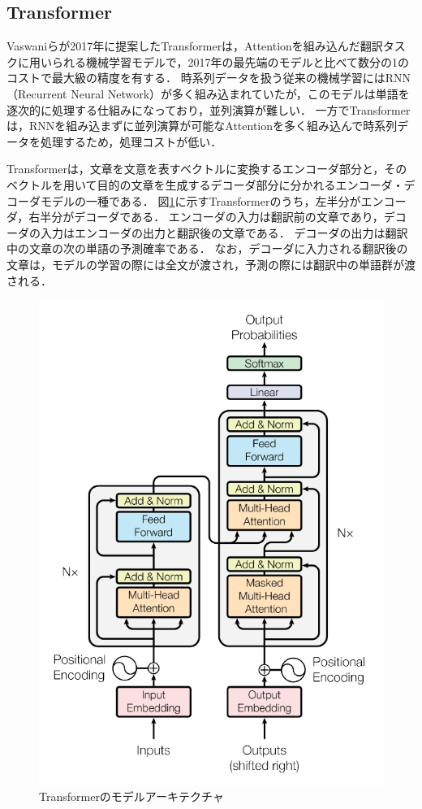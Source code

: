 \documentclass[12pt,a4j]{jreport}
\begin{document}
\subsection{Transformer}
Vaswaniらが2017年に提案したTransformerは，Attentionを組み込んだ翻訳タスクに用いられる機械学習モデルで，2017年の最先端のモデルと比べて数分の1のコストで最大級の精度を有する\cite{aurellen20}\cite{vaswani_attention_nodate}．
時系列データを扱う従来の機械学習にはRNN（Recurrent Neural Network）が多く組み込まれていたが，このモデルは単語を逐次的に処理する仕組みになっており，並列演算が難しい．
一方でTransformerは，RNNを組み込まずに並列演算が可能なAttentionを多く組み込んで時系列データを処理するため，処理コストが低い．

Transformerは，文章を文意を表すベクトルに変換するエンコーダ部分と，そのベクトルを用いて目的の文章を生成するデコーダ部分に分かれるエンコーダ・デコーダモデルの一種である．
図\ref{fig_transformer}に示すTransformerのうち，左半分がエンコーダ，右半分がデコーダである．
エンコーダの入力は翻訳前の文章であり，デコーダの入力はエンコーダの出力と翻訳後の文章である．
デコーダの出力は翻訳中の文章の次の単語の予測確率である．
なお，デコーダに入力される翻訳後の文章は，モデルの学習の際には全文が渡され，予測の際には翻訳中の単語群が渡される．

\begin{figure}[H]
	\centering
	\includegraphics[keepaspectratio, width=120mm]{img/transformer.png}
	\caption{Transformerのモデルアーキテクチャ\protect\footnotemark[2]}
	\label{fig_transformer}
\end{figure}
\end{document}
